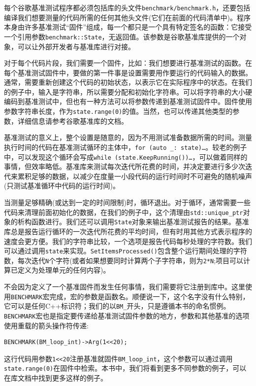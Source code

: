 每个谷歌基准测试程序都必须包括库的头文件\texttt{benchmark/benchmark.h}，还要包括编译我们想要测量的代码所需的任何其他头文件(它们在前面的代码清单中)。程序本身由许多基准测试“固件”组成，每一个都只是一个具有特定签名的函数：它接受一个引用参数\texttt{benchmark::State}，无返回值。该参数是谷歌基准库提供的一个对象，可以让外部开发者与基准库进行对接。

对于每个代码片段，我们需要一个固件，比如：我们想要进行基准测试的函数。在每个基准测试固件中，要做的第一件事是设置需要用作要运行的代码输入的数据。通常，需要重新创建这个代码的初始状态，以表示它在实际程序中的状态。在我们的例子中，输入是字符串，所以需要分配和初始化字符串。可以将字符串的大小硬编码到基准测试中，但也有一种方法可以将参数传递到基准测试固件中。固件使用参数字符串长度，作为\texttt{state.range(0)}的值。当然，也可以传递其他类型的参数，详细信息请参考谷歌基准库的文档。

基准测试的意义上，整个设置是随意的，因为不用测试准备数据所需的时间。测量执行时间的代码在基准测试循环的主体中，\texttt{for (auto \_: state){…}}。较老的例子中，可以发现这个循环会写成\texttt{while (state.KeepRunning()){…}}，可以做着同样的事情，但效率略低。基准库来测试每次迭代所花费的时间，并决定要进行多少次迭代来累积足够的数据，以减少在度量一小段代码的运行时间时不可避免的随机噪声(只测试基准循环中代码的运行时间)。

当测量足够精确(或达到一定的时间限制)时，循环退出。对于循环，通常需要一些代码来清理前面初始化的数据，在我们的例子中，这个清理由\texttt{std::unique\_ptr}对象的析构函数进行。我们还可以调用\texttt{State}对象来输出基准测试报告的结果。基准库总是报告运行循环的一次迭代所花费的平均时间，但有时用其他方式表示程序的速度会更方便。我们的字符串比较，一个选项是报告代码每秒处理的字符数。我们可以通过调用\texttt{state}来实现。\texttt{SetItemsProcessed()}包含整个运行期间处理的字符数，每次迭代\texttt{N}个字符(或者如果想要同时计算两个子字符串，则为\texttt{2*N};项目可以计算已定义为处理单元的任何内容)。

不会因为定义了一个基准固件而发生任何事情，我们需要将它注册到库中。这里使用\texttt{BENCHMARK}宏完成，宏的参数是函数名。顺便说一下，这个名字没有什么特别，它可以是任何C++标识符；我们的以\texttt{BM\_}开头，只是遵循本书的命名惯例。\texttt{BENCHMARK}宏也是指定要传递给基准测试固件参数的地方，参数和其他基准的选项使用重载的箭头操作符传递:

\begin{lstlisting}[style=styleCXX]
BENCHMARK(BM_loop_int)->Arg(1<<20);
\end{lstlisting}

这行代码用参数\texttt{1<<20}注册基准就固件\texttt{BM\_loop\_int}，这个参数可以通过调用\texttt{state.range(0)}在固件中检索。本书中，我们将看到更多不同参数的例子，可以在库文档中找到更多这样的例子。

